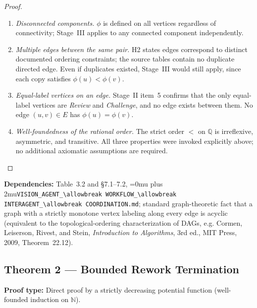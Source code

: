 \documentclass[12pt]{article}
\theoremstyle{definition}
\DeclareRobustCommand{\code}[1]{\begingroup\Urlmuskip=0mu plus 2mu\relax\nolinkurl{#1}\endgroup}
\newcommand{\VisionFlow}{\code{VISION\_AGENT\_\allowbreak WORKFLOW\_\allowbreak INTERAGENT\_\allowbreak COORDINATION.md}}
\begin{document}
\begin{proof}
\begin{enumerate}
  \item \emph{Disconnected components.}  $\phi$ is defined on all
        vertices regardless of connectivity; Stage~III applies to any
        connected component independently.

  \item \emph{Multiple edges between the same pair.}  H2 states edges
        correspond to distinct documented ordering constraints; the
        source tables contain no duplicate directed edge.  Even if
        duplicates existed, Stage~III would still apply, since each copy
        satisfies $\phi(u) < \phi(v)$.

  \item \emph{Equal-label vertices on an edge.}  Stage~II item~5
        confirms that the only equal-label vertices are
        \textit{Review} and \textit{Challenge}, and no edge exists
        between them.  No edge $(u,v)\in E$ has $\phi(u) = \phi(v)$.

  \item \emph{Well-foundedness of the rational order.}  The strict
        order $<$ on $\mathbb{Q}$ is irreflexive, asymmetric, and
        transitive.  All three properties were invoked explicitly above;
        no additional axiomatic assumptions are required.
\end{enumerate}
\end{proof}

\begin{sloppypar}
\textbf{Dependencies:} Table~3.2 and \S7.1--7.2,
\VisionFlow{}; standard
graph-theoretic fact that a graph with a strictly monotone vertex labeling
along every edge is acyclic (equivalent to the topological-ordering
characterization of DAGs, e.g. Cormen, Leiserson, Rivest, and Stein,
\emph{Introduction to Algorithms}, 3rd ed., MIT Press, 2009, Theorem~22.12).
\end{sloppypar}

\subsection{Theorem 2 --- Bounded Rework Termination}

\textbf{Proof type:} Direct proof by a strictly decreasing potential
function (well-founded induction on $\mathbb{N}$).
\end{document}
